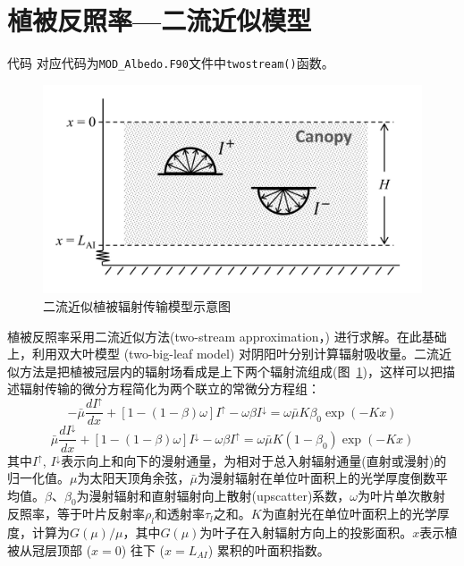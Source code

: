 \section{植被反照率---二流近似模型}\label{植被反照率二流近似模型}
\begin{mymdframed}{代码}
对应代码为\texttt{MOD\_Albedo.F90}文件中\texttt{twostream()}函数。
\end{mymdframed}

{
\begin{figure}[htbp]
\centering
\includegraphics[width=0.7\columnwidth]{Figures/辐射过程及辐射通量计算/二流近似模型示意图.png}
\caption{二流近似植被辐射传输模型示意图}
\label{fig:二流近似模型示意图}
\end{figure}
}
植被反照率采用二流近似方法(two-stream approximation，\citet{dickinson1983land,sellers1985canopy}) 进行求解。在此基础上，利用双大叶模型 (two-big-leaf model) \citep{dai2004two} 对阴阳叶分别计算辐射吸收量。二流近似方法是把植被冠层内的辐射场看成是上下两个辐射流组成(图~\ref{fig:二流近似模型示意图})，这样可以把描述辐射传输的微分方程简化为两个联立的常微分方程组：
\begin{equation}\label{di_dx1}
-\bar{\mu} \frac{d I^{\uparrow}}{d x}+\left[1-(1-\beta) \omega\right] I^{\uparrow}-\omega \beta I^{\downarrow}=\omega \bar{\mu} K \beta_{0} \exp (-K x)
\end{equation}
\begin{equation}\label{di_dx2}
\bar{\mu} \frac{d I^{\downarrow}}{d x}+\left[1-(1-\beta) \omega\right] I^{\downarrow}-\omega \beta I^{\uparrow}=\omega \bar{\mu} K\left(1-\beta_{0}\right) \exp (-K x)
\end{equation}
其中$I^{\uparrow}$, $I^{\downarrow}$表示向上和向下的漫射通量，为相对于总入射辐射通量(直射或漫射)的归一化值。$\mu$为太阳天顶角余弦，$\bar{\mu}$为漫射辐射在单位叶面积上的光学厚度倒数平均值。$\beta$、$\beta_{0}$为漫射辐射和直射辐射向上散射(upscatter)系数，$\omega$为叶片单次散射反照率，等于叶片反射率$\rho_{l}$和透射率$\tau_{l}$之和。$K$为直射光在单位叶面积上的光学厚度，计算为$G(\mu) / \mu$，其中$G(\mu)$为叶子在入射辐射方向上的投影面积。$x$表示植被从冠层顶部 ($x=0$) 往下 ($x=L_{AI}$) 累积的叶面积指数。

